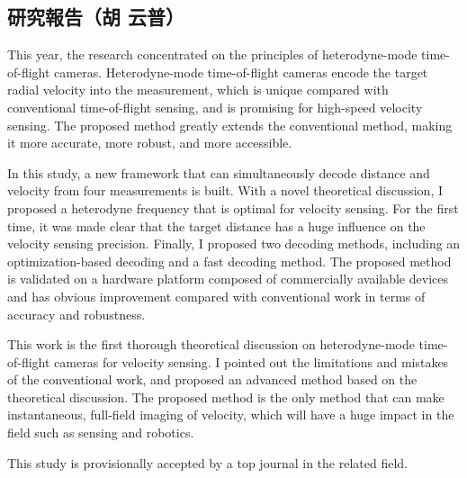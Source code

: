 \subsection{研究報告（胡 云普）}

This year, the research concentrated on the principles of heterodyne-mode time-of-flight cameras. Heterodyne-mode time-of-flight cameras encode the target radial velocity into the measurement, which is unique compared with conventional time-of-flight sensing, and is promising for high-speed velocity sensing. The proposed method greatly extends the conventional method, making it more accurate, more robust, and more accessible.

In this study, a new framework that can simultaneously decode distance and velocity from four measurements is built. With a novel theoretical discussion, I proposed a heterodyne frequency that is optimal for velocity sensing. For the first time, it was made clear that the target distance has a huge influence on the velocity sensing precision. Finally, I proposed two decoding methods, including an optimization-based decoding and a fast decoding method. The proposed method is validated on a hardware platform composed of commercially available devices and has obvious improvement compared with conventional work in terms of accuracy and robustness.

This work is the first thorough theoretical discussion on heterodyne-mode time-of-flight cameras for velocity sensing. I pointed out the limitations and mistakes of the conventional work, and proposed an advanced method based on the theoretical discussion. The proposed method is the only method that can make instantaneous, full-field imaging of velocity, which will have a huge impact in the field such as sensing and robotics.

This study is provisionally accepted by a top journal in the related field.
